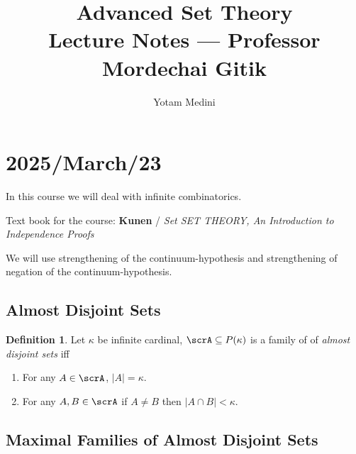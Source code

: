 \documentclass[11pt,pdftex,twoside,a4paper]{article}
\title{Advanced Set Theory
          \\
       Lecture Notes --- Professor Mordechai Gitik}
\author{Yotam Medini}
\newcommand{\B}[1]{\textbf{#1}}
\theoremstyle{definition}
\newtheorem{ldef}[thm]{Definition}
\begin{document}
\maketitle
\newpage
\tableofcontents
\newpage

\section{2025/March/23}

In this course we will deal with infinite combinatorics.

Text book for the course:
  \B{Kunen} / \textit{Set SET THEORY, 
    An Introduction to Independence Proofs}

We will use strengthening of the continuum-hypothesis
and strengthening of negation of the continuum-hypothesis.

\subsection{Almost Disjoint Sets}

\begin{ldef}
Let \(\kappa\) be infinite cardinal, \(\scrA \subseteq P(\kappa)\)
is a family of of \emph{almost disjoint sets} iff 
\begin{enumerate}
\item For any \(A\in \scrA\), \(|A|=\kappa\).
\item For any \(A,B \in \scrA\) if \(A\neq B\) then \(|A \cap B|<\kappa\).
\end{enumerate}
\end{ldef}

\subsection{Maximal Families of Almost Disjoint Sets}
\end{document}
